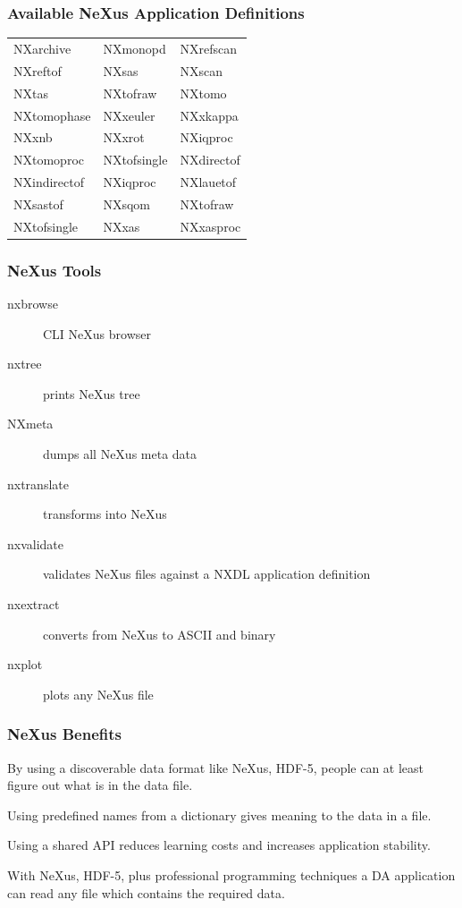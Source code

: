 \documentclass{beamer}
\newcommand{\changefont}[3] {
 \fontfamily{#1} \fontseries{#2} \fontshape{#3} \selectfont}
\begin{document}
\begin{frame} \frametitle{Available NeXus Application Definitions}
{\changefont{cmr}{bx}{sc} 
\begin{tabular}{lll}
NXarchive& NXmonopd & NXrefscan \\
NXreftof & NXsas & NXscan \\
NXtas & NXtofraw& NXtomo\\
NXtomophase & NXxeuler & NXxkappa\\
NXxnb & NXxrot & NXiqproc \\
NXtomoproc & NXtofsingle& NXdirectof\\
NXindirectof & NXiqproc& NXlauetof\\
NXsastof& NXsqom& NXtofraw\\
NXtofsingle& NXxas& NXxasproc\\
\end{tabular}
}
\end{frame}


\begin{frame} \frametitle{NeXus Tools}
\begin{description}
\item[nxbrowse] CLI NeXus browser
\item[nxtree] prints NeXus tree
\item[NXmeta] dumps all NeXus meta data
\item[nxtranslate] transforms into NeXus 
\item[nxvalidate] validates NeXus files against a NXDL application definition 
\item[nxextract] converts from NeXus to ASCII and binary
\item[nxplot] plots any NeXus file
\end{description}
\end{frame}


\begin{frame} \frametitle{NeXus Benefits}
\begin{description}
\item<1->[Benefit 1] By using a discoverable data format like NeXus, HDF-5, people can at 
 least figure out  what is in the data file. 
\item<2->[Benefit 2] Using predefined names from a dictionary gives meaning to the data in a file.
\item<3->[Benefit 3] Using a shared API reduces learning costs and increases application stability.
\item<4->[Benefit 4] With NeXus, HDF-5, plus professional programming techniques a DA application can 
 read any file which contains the required data.
\end{description}
\end{frame}
\end{document}
